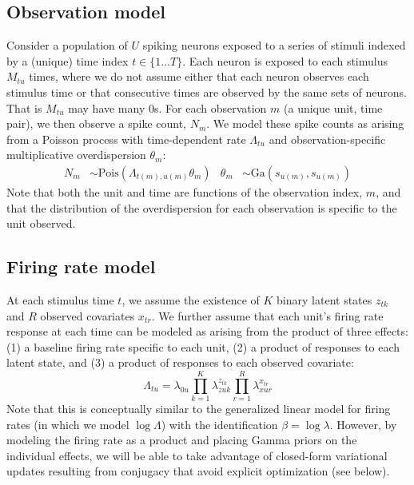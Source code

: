 \documentclass{article} %
\begin{document}
\subsection{Observation model}
Consider a population of $U$ spiking neurons exposed to a series of stimuli indexed by a (unique) time index $t\in \lbrace 1\ldots T\rbrace$. Each neuron is exposed to each stimulus $M_{tu}$ times, where we do not assume either that each neuron observes each stimulus time or that consecutive times are observed by the same sets of neurons. That is $M_{tu}$ may have many 0s. For each observation $m$ (a unique unit, time pair), we then observe a spike count, $N_m$. We model these spike counts as arising from a Poisson process with time-dependent rate $\Lambda_{tu}$ and observation-specific multiplicative overdispersion $\theta_m$:
\begin{align}
    \label{obs_model}
    N_{m} &\sim \text{Pois}(\Lambda_{t(m), u(m)} \theta_m) &
    \theta_m &\sim \text{Ga}(s_{u(m)}, s_{u(m)})
\end{align}
Note that both the unit and time are functions of the observation index, $m$, and that the distribution of the overdispersion for each observation is specific to the unit observed. 

\subsection{Firing rate model}
At each stimulus time $t$, we assume the existence of $K$ binary latent states $z_{tk}$ and $R$ observed covariates $x_{tr}$. We further assume that each unit's firing rate response at each time can be modeled as arising from the product of three effects: (1) a baseline firing rate specific to each unit, (2) a product of responses to each latent state, and (3) a product of responses to each observed covariate:
\begin{equation}
    \label{fr_model}
    \Lambda_{tu} = \lambda_{0u} \prod_{k = 1}^K \lambda_{zuk}^{z_{tk}}  
    \prod_{r = 1}^R \lambda_{xur}^{x_{tr}}   
\end{equation} 
Note that this is conceptually similar to the generalized linear model for firing rates (in which we model $\log \Lambda$) with the identification $\beta = \log \lambda$. However, by modeling the firing rate as a product and placing Gamma priors on the individual effects, we will be able to take advantage of closed-form variational updates resulting from conjugacy that avoid explicit optimization (see below). 
\end{document}
